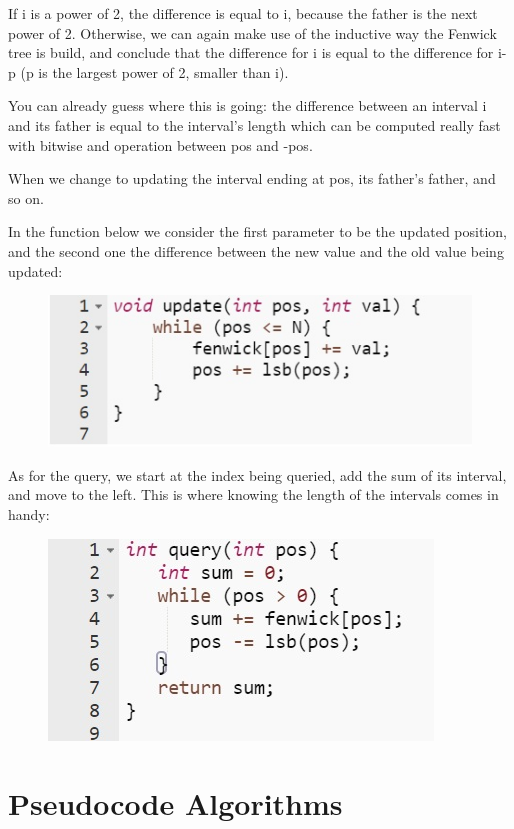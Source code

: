 \documentclass{article}
\begin{document}
If i is a power of 2, the difference is equal to i, because the father is the next power of 2. Otherwise, we can again make use of the inductive way the Fenwick tree is build, and conclude that the difference for i is equal to the difference for i-p (p is the largest power of 2, smaller than i). 

You can already guess where this is going: the difference between an interval i and its father is equal to the interval's length which can be computed really fast with bitwise and operation between pos and -pos.

When we change to updating the interval ending at pos, its father's father, and so on.

In the function below we consider the first parameter to be the updated position, and the second one the difference between the new value and the old value being updated:

\begin{figure}[h!]
\includegraphics[scale=0.7]{query_aib_fotoexplanation.jpg}
\end{figure}

As for the query, we start at the index being queried, add the sum of its interval, and move to the left. This is where knowing the length of the intervals comes in handy:

\begin{figure}[h!]
\includegraphics[scale=0.7]{query_aib_fotoexplanation_the_real.jpg}
\end{figure}


\section{Pseudocode Algorithms}
\end{document}
